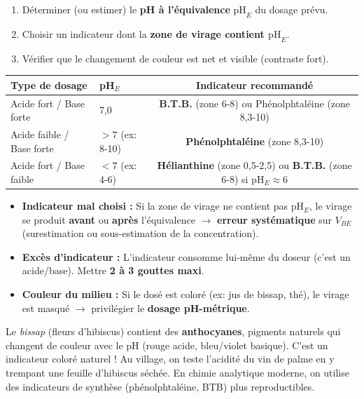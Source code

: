 \documentclass[11pt]{article}
\begin{document}
\begin{methode}
\begin{enumerate}
  \item Déterminer (ou estimer) le \textbf{pH à l'équivalence} $\mathrm{pH}_E$ du dosage prévu.
  \item Choisir un indicateur dont la \textbf{zone de virage contient $\mathrm{pH}_E$}.
  \item Vérifier que le changement de couleur est net et visible (contraste fort).
\end{enumerate}
\end{methode}

\begin{center}
\begin{tabularx}{\linewidth}{|l|X|c|}
\hline
\rowcolor{popblueL} \textbf{Type de dosage} & \textbf{pH$_E$} & \textbf{Indicateur recommandé} \\
\hline
Acide fort / Base forte & 7,0 & \textbf{B.T.B.} (zone 6-8) ou Phénolphtaléine (zone 8,3-10) \\
\hline
Acide faible / Base forte & $> 7$ (ex: 8-10) & \textbf{Phénolphtaléine} (zone 8,3-10) \\
\hline
Acide fort / Base faible & $< 7$ (ex: 4-6) & \textbf{Hélianthine} (zone 0,5-2,5) ou \textbf{B.T.B.} (zone 6-8) si pH$_E \approx 6$ \\
\hline
\end{tabularx}
\end{center}

\begin{attention}
\begin{itemize}
  \item \textbf{Indicateur mal choisi :} Si la zone de virage ne contient pas pH$_E$, le virage se produit \textbf{avant} ou \textbf{après} l'équivalence $\rightarrow$ \textbf{erreur systématique} sur $V_{BE}$ (surestimation ou sous-estimation de la concentration).
  \item \textbf{Excès d'indicateur :} L'indicateur consomme lui-même du doseur (c'est un acide/base). Mettre \textbf{2 à 3 gouttes maxi}.
  \item \textbf{Couleur du milieu :} Si le dosé est coloré (ex: jus de bissap, thé), le virage est masqué $\rightarrow$ privilégier le \textbf{dosage pH-métrique}.
\end{itemize}
\end{attention}

\begin{savaistu}
Le \emph{bissap} (fleurs d'hibiscus) contient des \textbf{anthocyanes}, pigments naturels qui changent de couleur avec le pH (rouge acide, bleu/violet basique). C'est un indicateur coloré naturel ! Au village, on teste l'acidité du vin de palme en y trempant une feuille d'hibiscus séchée. En chimie analytique moderne, on utilise des indicateurs de synthèse (phénolphtaléine, BTB) plus reproductibles.
\end{savaistu}
\end{document}
